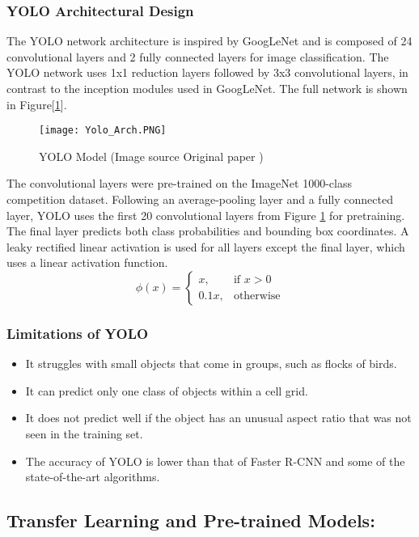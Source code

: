 \subsubsection{YOLO Architectural Design}
The YOLO network architecture is inspired by GoogLeNet and is composed of 24 convolutional layers and 2 fully connected layers for image classification. The YOLO network uses 1x1 reduction layers followed by 3x3 convolutional layers, in contrast to the inception modules used in GoogLeNet. The full network is shown in Figure[\ref{fig:YOLO_arc}].
\begin{figure}[H]
    \centering
    \texttt{[image: Yolo\_Arch.PNG]}
    \caption{YOLO Model (Image source Original paper \cite{redmon2016you})}
    \label{fig:YOLO_arc}
\end{figure}
The convolutional layers were pre-trained on the ImageNet 1000-class competition dataset. Following an average-pooling layer and a fully connected layer, YOLO uses the first 20 convolutional layers from Figure \ref{fig:YOLO_arc} for pretraining. The final layer predicts both class probabilities and bounding box coordinates. A leaky rectified linear activation is used for all layers except the final layer, which uses a linear activation function.
 \[
 \phi(x)=\begin{cases}
           x, & \text{if } x>0 \\
          0.1x, & \text{otherwise}
      \end{cases}
\]

\subsubsection{Limitations of YOLO}
\begin{itemize}
    \item It struggles with small objects that come in groups, such as flocks of birds.
    \item It can predict only one class of objects within a cell grid.
    \item It does not predict well if the object has an unusual aspect ratio that was not seen in the training set.
    \item The accuracy of YOLO is lower than that of Faster R-CNN and some of the state-of-the-art algorithms.
\end{itemize}

\subsection{Transfer Learning and Pre-trained Models:}

